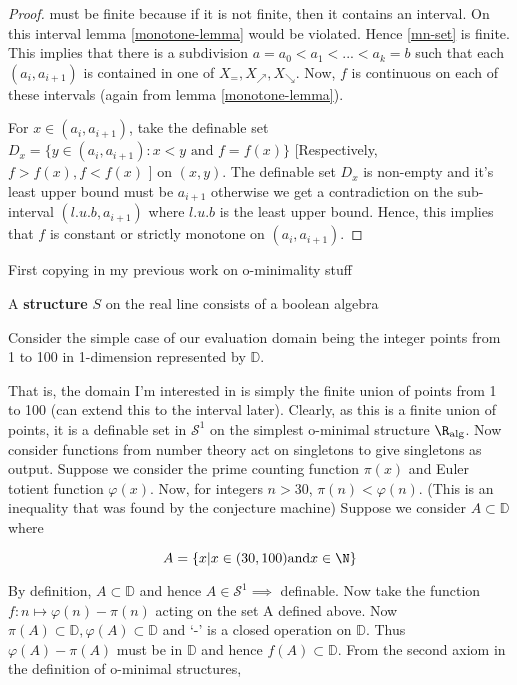 \begin{proof}
    must be finite because if it is not finite, then it contains an interval. On this interval lemma \ref{monotone-lemma} would be violated. Hence \ref{mn-set} is finite. This implies that there is a subdivision $a = a_0 < a_1 < ... < a_k = b$ such that each $(a_i, a_{i+1})$ is contained in one of $X_=, X_\nearrow, X_\searrow$. Now, $f$ is continuous on each of these intervals (again from lemma \ref{monotone-lemma}). \par For $x\in (a_i, a_{i+1})$, take the definable set $D_x = \{y\in(a_i, a_{i+1}): x < y \text{ and } f = f(x)\}$ [Respectively, $f > f(x), f < f(x)$ ] on $(x,y)$. The definable set $D_x$ is non-empty and it's least upper bound must be $a_{i+1}$ otherwise we get a contradiction on the sub-interval $(l.u.b, a_{i+1})$ where $l.u.b$ is the least upper bound. Hence, this implies that $f$ is constant or strictly monotone on $(a_i, a_{i+1})$.
\end{proof}

First copying in my previous work on o-minimality stuff

\begin{definition}[Structure]
    A \textbf{structure} $S$ on the real line consists of a boolean algebra
\end{definition}

Consider the simple case of our evaluation domain being the integer points from 1 to 100 in 1-dimension represented by $\mathbb{D}$.

That is, the domain I'm interested in is simply the finite union of points from 1 to 100 (can extend this to the interval later). Clearly, as this is a finite union of points, it is a definable set in $\mathcal{S}^1$ on the simplest o-minimal structure $\R_{\text{alg}}$.
Now consider functions from number theory act on singletons to give singletons as output. Suppose we consider the prime counting function $\pi(x)$ and Euler totient function $\varphi(x)$. Now, for integers $n > 30$, $\pi(n) < \varphi(n)$. (This is an inequality that was found by the conjecture machine)
Suppose we consider $A\subset\mathbb{D}$ where

\begin{equation*}
    A = \{x | x\in (30, 100) \text{and} x\in\N \}
\end{equation*}

By definition, $A\subset\mathbb{D}$ and hence $A\in\mathcal{S}^1 \implies $ definable.
Now take the function $f: n\mapsto\varphi(n) - \pi(n)$ acting on the set A defined above. Now $\pi(A)\subset\mathbb{D}, \varphi(A)\subset\mathbb{D}$ and `-' is a closed operation on $\mathbb{D}$. Thus $\varphi(A) - \pi(A)$ must be in $\mathbb{D}$ and hence $f(A)\subset\mathbb{D}$.
From the second axiom in the definition of o-minimal structures,


